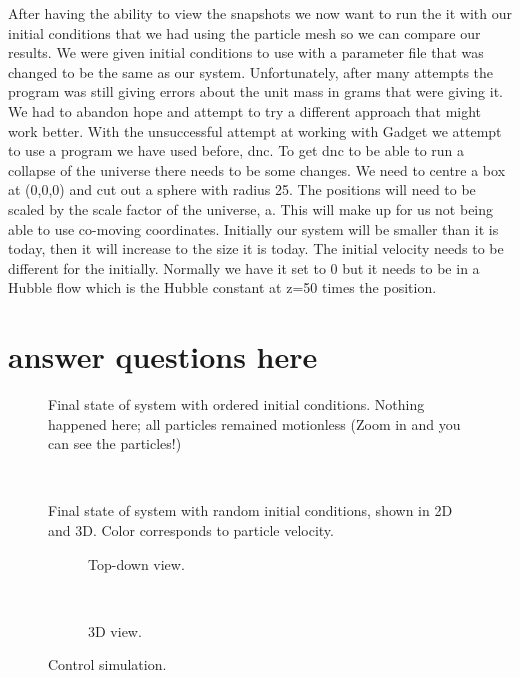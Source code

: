 \documentclass[10pt]{article}
\begin{document}
After having the ability to view the snapshots we now want to run the it with our initial conditions that we had using the particle mesh so we can compare our results. We were given initial conditions to use with a parameter file that was changed to be the same as our system. Unfortunately, after many attempts the program was still giving errors about the unit mass in grams that were giving it. We had to abandon hope and attempt to try a different approach that might work better. With the unsuccessful attempt at working with Gadget we attempt to use a program we have used before, dnc. 
	To get dnc to be able to run a collapse of the universe there needs to be some changes. We need to centre a box at (0,0,0) and cut out a sphere with radius 25.  The positions will need to be scaled by the scale factor of the universe, a. This will make up for us not being able to use co-moving coordinates. Initially our system will be smaller than it is today, then it will increase to the size it is today. The initial velocity needs to be different for the initially. Normally we have it set to 0 but it needs to be in a Hubble flow which is the Hubble constant at z=50 times the position. 
\section{answer questions here}


\begin{figure}[htbp]
\centering

\caption{Final state of system with ordered initial conditions. Nothing happened here; all particles remained motionless (Zoom in and you can see the particles!)}
\label{fig:order}
\end{figure}

\begin{figure}[htbp]
\centering
\begin{subfigure}{\textwidth}
\centering

\end{subfigure} \\
\begin{subfigure}{\textwidth}
\centering

\end{subfigure}
\caption{Final state of system with random initial conditions, shown in 2D and 3D. Color corresponds to particle velocity.}
\label{fig:randomic}
\end{figure}

\begin{figure}[htbp]
\centering
\begin{subfigure}{\textwidth}
\centering

\caption{Top-down view.}
\end{subfigure} \\
\begin{subfigure}{\textwidth}
\centering

\caption{3D view.}
\end{subfigure}
\caption{Control simulation.}
\label{fig:control}
\end{figure}
\end{document}
